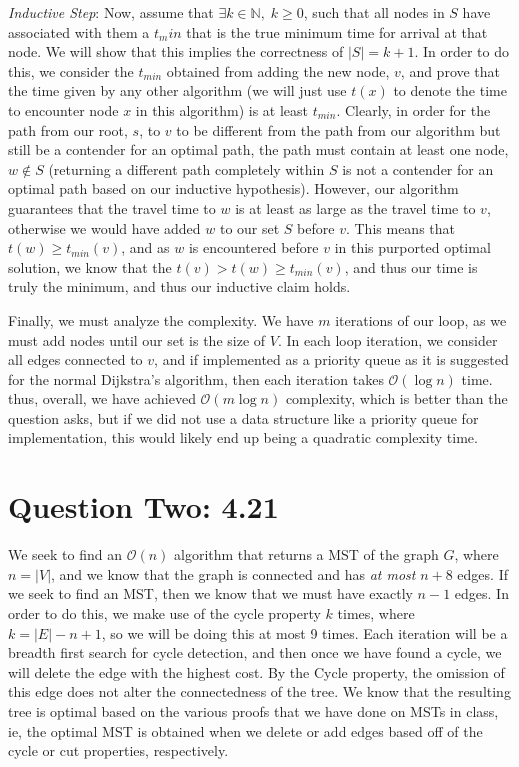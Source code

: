 \documentclass[11pt,letterpaper]{article}
\begin{document}
\textit{Inductive Step}: Now, assume that $\exists k \in \mathbb{N}, \; k \geq 0$, such that all nodes in $S$ have associated with them a $t_min$ that is the true minimum time for arrival at that node. We will show that this implies the correctness of $|S| = k + 1$. In order to do this, we consider the $t_{min}$ obtained from adding the new node, $v$, and prove that the time given by any other algorithm (we will just use $t(x)$ to denote the time to encounter node $x$ in this algorithm) is at least $t_{min}$. Clearly, in order for the path from our root, $s$, to $v$ to be different from the path from our algorithm but still be a contender for an optimal path, the path must contain at least one node, $w \notin S$ (returning a different path completely within $S$ is not a contender for an optimal path based on our inductive hypothesis). However, our algorithm guarantees that the travel time to $w$ is at least as large as the travel time to $v$, otherwise we would have added $w$ to our set $S$ before $v$. This means that $t(w) \geq t_{min}(v)$, and as $w$ is encountered before $v$ in this purported optimal solution, we know that the $t(v) > t(w) \geq t_{min}(v)$, and thus our time is truly the minimum, and thus our inductive claim holds. 

Finally, we must analyze the complexity. We have $m$ iterations of our loop, as we must add nodes until our set is the size of $V$. In each loop iteration, we consider all edges connected to $v$, and if implemented as a priority queue as it is suggested for the normal Dijkstra's algorithm, then each iteration takes $\mathcal{O}(\log n)$ time. thus, overall, we have achieved $\mathcal{O}(m \log n)$ complexity, which is better than the question asks, but if we did not use a data structure like a priority queue for implementation, this would likely end up being a quadratic complexity time. 


\section*{Question Two: 4.21}
We seek to find an $\mathcal{O}(n)$ algorithm that returns a MST of the graph $G$, where $n = |V|$, and we know that the graph is connected and has \textit{at most} $n+8$ edges. If we seek to find an MST, then we know that we must have exactly $n-1$ edges. In order to do this, we make use of the cycle property $k$ times, where $k = |E| - n + 1$, so we will be doing this at most 9 times. Each iteration will be a breadth first search for cycle detection, and then once we have found a cycle, we will delete the edge with the highest cost. By the Cycle property, the omission of this edge does not alter the connectedness of the tree. We know that the resulting tree is optimal based on the various proofs that we have done on MSTs in class, ie, the optimal MST is obtained when we delete or add edges based off of the cycle or cut properties, respectively. 
\end{document}
